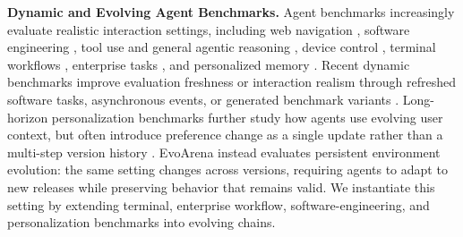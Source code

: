 \documentclass{llmxive}
\begin{document}
\textbf{Dynamic and Evolving Agent Benchmarks.} \quad
Agent benchmarks increasingly evaluate realistic interaction settings, including web navigation \cite{zhou2023webarena}, software engineering \cite{jimenez2024swebench}, tool use and general agentic reasoning \cite{liu2024agentbench,mialon2024gaia}, device control \cite{rawles2025androidworld}, terminal workflows \cite{terminal-bench}, enterprise tasks \cite{workarena++}, and personalized memory \cite{jiang2025personamem}. Recent dynamic benchmarks improve evaluation freshness or interaction realism through refreshed software tasks, asynchronous events, or generated benchmark variants \cite{gaia2,li2026swe-benchl-ive,benchmark-selfevolv}. Long-horizon personalization benchmarks further study how agents use evolving user context, but often introduce preference change as a single update rather than a multi-step version history \cite{li2026horizonbench}. EvoArena instead evaluates persistent environment evolution: the same setting changes across versions, requiring agents to adapt to new releases while preserving behavior that remains valid. We instantiate this setting by extending terminal, enterprise workflow, software-engineering, and personalization benchmarks into evolving chains.
\end{document}

